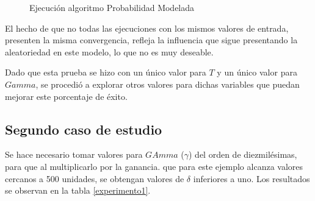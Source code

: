 \begin{figure}
\begin{subfigure}[b]{0.38\textwidth}
        \label{fig:tiger}
    \end{subfigure}    
    \caption{Ejecución algoritmo Probabilidad Modelada}
    \label{Ejecuta10}
\end{figure}

El hecho de que no todas las ejecuciones con los mismos valores de entrada, presenten la misma convergencia, refleja la influencia que sigue presentando la aleatoriedad en este modelo, lo que no es muy deseable.

Dado que esta prueba se hizo con un único valor para $T$ y un único valor para $Gamma$, se procedió a explorar otros valores para dichas variables que puedan mejorar este porcentaje de éxito.

\subsection{Segundo caso de estudio}

Se hace necesario tomar valores para $GAmma$ ($\gamma$) del orden de diezmilésimas, para que al multiplicarlo por la ganancia. que para este ejemplo alcanza valores cercanos a 500 unidades, se obtengan valores de $\delta$ inferiores a uno. Los resultados se observan en la tabla \ref{experimento1}.

